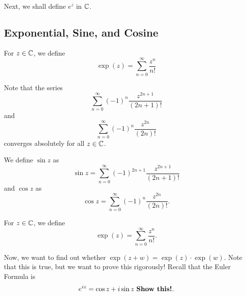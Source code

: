 \documentclass[a4paper]{report}
\begin{document}
Next, we shall define \( e^{z} \) in \( \mathbb{C}  \). 

\subsection{Exponential, Sine, and Cosine}\label{Exponential, Sine, and Cosine functions}

\begin{definition}
    For \( z \in \mathbb{C}  \), we define 
    \[ \exp(z) = \sum_{ n=0  }^{  \infty  } \frac{ z^{n} }{ n!  }   \]
\end{definition}
Note that the series 
            \[  \sum_{ n=0 }^{ \infty  } (-1)^{n} \frac{ z^{2n+1} }{ (2n+1)!  }  \]
            and 
            \[  \sum_{ n=0  }^{ \infty  } (-1)^{n} \frac{ z^{2n} }{ (2n)! }  \]
            converges absolutely for all \( z \in \mathbb{C}  \).
\begin{definition}
         We define  \( \sin z  \) as
            \[ \sin z = \sum_{ n=0 }^{ \infty  } (-1)^{2n+1} \frac{ z^{2n+1} }{ (2n+1)! } \]
            and \( \cos z  \) as 
            \[  \cos z  =  \sum_{ n = 0  }^{ \infty  } (-1)^{n} \frac{ z^{2n} }{ (2n)! }.  \]
\end{definition}

\begin{definition}[ ]
    For \( z \in \mathbb{C}  \), we define 
    \[  \exp(z) = \sum_{ n=0 }^{ \infty  } \frac{ z^{n} }{ n! }. \]
\end{definition}

Now, we want to find out whether \( \exp(z + w) = \exp(z) \cdot \exp(w) \). Note that this is true, but we want to prove this rigorously! Recall that the Euler Formula is
\[  e^{iz} = \cos z + i \sin z \  \text{\textbf{Show this!}}. \]
\end{document}
